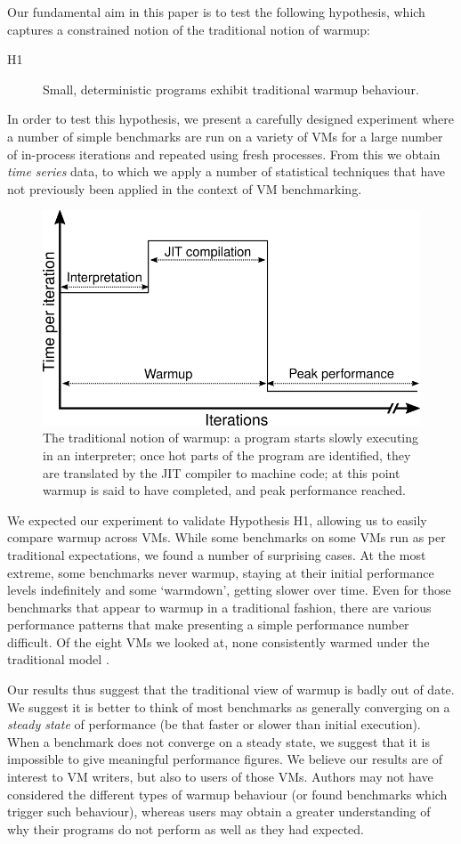 \documentclass[10pt,preprint]{sigplanconf}
\newcommand{\hypone}{H1\xspace}
\begin{document}
Our fundamental aim in this paper is to test the following hypothesis, which captures a constrained
notion of the traditional notion of warmup:
\begin{description}
  \item[\hypone] Small, deterministic programs exhibit traditional warmup behaviour.
\end{description}
In order to test this hypothesis, we present a carefully designed
experiment where a number of simple benchmarks are run on a variety of
VMs for a large number of in-process iterations and repeated using fresh
processes. From this we obtain \emph{time series} data, to which we apply a
number of statistical techniques that have not previously been applied
in the context of VM benchmarking.

\begin{figure}[b!]
\centering
\includegraphics[width=.4\textwidth]{img/picturebook_warmup}
\caption{The traditional notion of warmup: a program starts slowly executing in
an interpreter; once hot parts of the program are identified, they are
translated by the JIT compiler to machine code; at this point warmup
is said to have completed, and peak performance reached.}
\label{fig:trad}
\end{figure}

We expected our experiment to validate Hypothesis H1, allowing us to
easily compare warmup across VMs. While some benchmarks on some VMs run as per
traditional expectations, we found a number of surprising cases. At
the most extreme, some benchmarks never warmup, staying at their initial performance
levels indefinitely and some `warmdown', getting slower over time. Even for
those benchmarks that appear to warmup in a traditional fashion, there are
various performance patterns that make presenting a simple performance number
difficult. Of the eight VMs we looked at,
none consistently warmed under the traditional model .

Our results thus suggest that the traditional view of warmup is badly out of date. 
We suggest it is better to think of most benchmarks as
generally converging on a \emph{steady state} of performance (be that faster or
slower than initial execution). When a benchmark does not converge on a steady
state, we suggest that it is impossible to give meaningful performance figures.
We believe our results are of interest to VM writers, but also to users of
those VMs. Authors may not have considered the different types of warmup
behaviour (or found benchmarks which trigger such behaviour), whereas users may
obtain a greater understanding of why their programs do not perform as well as
they had expected.
\end{document}
